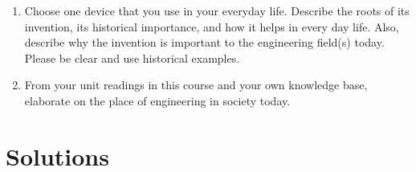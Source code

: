 \documentclass{article}
\begin{document}
\begin{enumerate}
\EEN
\item Choose one device that you use in your everyday life. Describe the roots of its invention, its historical importance, and how it helps in every day life. Also, describe why the invention is important to the engineering field(s) today. Please be clear and use historical examples.
\item From your unit readings in this course and your own knowledge base, elaborate on the place of engineering in society today.

\end{enumerate} %

\newpage
\section*{Solutions}
\end{document}
